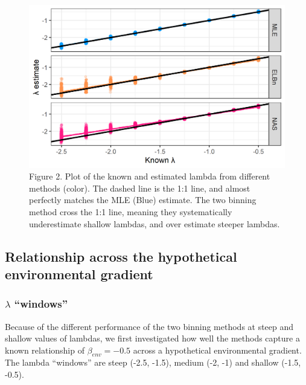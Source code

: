 \documentclass[
]{article}
\begin{document}
\begin{figure}
\centering
\includegraphics{figures/known_est_b_line.png}
\caption{Figure 2. Plot of the known and estimated lambda from different
methods (color). The dashed line is the 1:1 line, and almost perfectly
matches the MLE (Blue) estimate. The two binning method cross the 1:1
line, meaning they systematically underestimate shallow lambdas, and
over estimate steeper lambdas.}
\end{figure}

\hypertarget{relationship-across-the-hypothetical-environmental-gradient}{%
\subsection{Relationship across the hypothetical environmental
gradient}\label{relationship-across-the-hypothetical-environmental-gradient}}

\hypertarget{lambda-windows}{%
\subsubsection{\texorpdfstring{\(\lambda\)
``windows''}{\textbackslash lambda ``windows''}}\label{lambda-windows}}

Because of the different performance of the two binning methods at steep
and shallow values of lambdas, we first investigated how well the
methods capture a known relationship of \(\beta_{env} = -0.5\) across a
hypothetical environmental gradient. The lambda ``windows'' are steep
(-2.5, -1.5), medium (-2, -1) and shallow (-1.5, -0.5).
\end{document}
